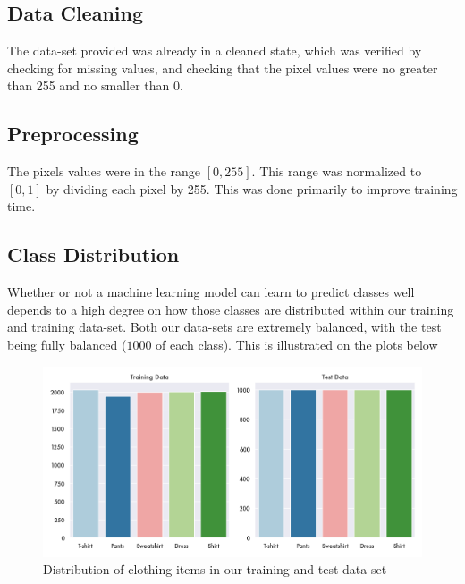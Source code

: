\subsection{Data Cleaning}
The data-set provided was already in a cleaned state, which was verified by checking for missing values, and checking that the pixel values were no greater than 255 and no smaller than 0. 

\subsection{Preprocessing}
The pixels values were in the range $[0, 255]$. This range was normalized to $[0, 1]$ by dividing each pixel by 255. This was done primarily to improve training time. %

\subsection{Class Distribution}
Whether or not a machine learning model can learn to predict classes well depends to a high degree on how those classes are distributed within our training and training data-set. Both our data-sets are extremely balanced, with the test being fully balanced ($1000$ of each class). This is illustrated on the plots below

\begin{figure}[ht]
\centering
\includegraphics[scale=0.45]{figures_for_report/class_distribution}
\captionsetup{justification=centering,margin=2cm}
\caption{Distribution of clothing items in our training and test data-set}
\end{figure}

